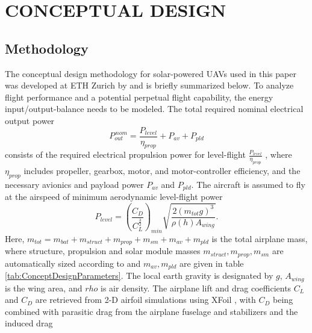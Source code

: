 \section{CONCEPTUAL DESIGN}

\subsection{Methodology} \label{sec:ConceptualDesignMethodology}

The conceptual design methodology for solar-powered UAVs used in this paper was developed at ETH Zurich by \cite{Noth_PhD,Leutenegger_JIRS} and is briefly summarized below. To analyze flight performance and a potential perpetual flight capability, the energy input/output-balance needs to be modeled. The total required nominal electrical output power
\begin{equation} \label{eqn:P_out}
P_{out}^{\,nom}=\frac{P_{level}}{\eta_{prop}}+P_{av}+P_{pld}
\end{equation}
consists of the required electrical propulsion power for level-flight $\frac{P_{level}}{\eta_{prop}}$ , where $\eta_{prop}$ includes propeller, gearbox, motor, and motor-controller efficiency, and the necessary avionics and payload power $P_{av}$ and $P_{pld}$. The aircraft is assumed to fly at the airspeed of minimum aerodynamic level-flight power
\begin{equation} \label{eqn:P_level}
P_{level}=\left(\frac{C_D}{C_L^\frac{3}{2}}\right)_{min}\sqrt{\frac{2(m_{tot}g)^3}{\rho(h)A_{wing}}} .
\end{equation}
Here, $m_{tot}=m_{bat}+m_{struct}+m_{prop}+m_{sm}+m_{av}+m_{pld}$ is the total airplane mass, where structure, propulsion and solar module masses $m_{struct},m_{prop},m_{sm}$ are automatically sized according to \cite{Noth_PhD,Leutenegger_JIRS} and $m_{av},m_{pld}$ are given in table \ref{tab:ConceptDesignParameters}. The local earth gravity is designated by $g$, $A_{wing}$ is the wing area, and $rho$ is air density. The airplane lift and drag coefficients $C_L$ and $C_D$ are retrieved from 2-D airfoil simulations using XFoil \cite{Drela_XFoil}, with $C_D$ being combined with parasitic drag from the airplane fuselage and stabilizers and the induced drag  
